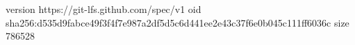 version https://git-lfs.github.com/spec/v1
oid sha256:d535d9fabce49f3f4f7e987a2df5d5c6d441ee2e43c37f6e0b045c111ff6036c
size 786528
